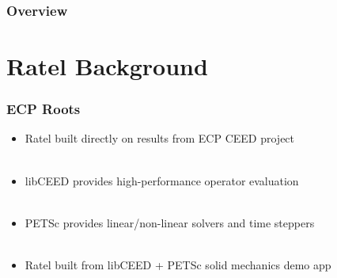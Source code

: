 \documentclass{beamer}
\begin{document}

\begin{frame}
\frametitle{Overview} %
\tableofcontents %
\end{frame}

\section{Ratel Background}

\begin{frame}
\begin{center}
\frametitle{ECP Roots}

\begin{itemize}

\item Ratel built directly on results from ECP CEED project\\

~\\

\item libCEED provides high-performance operator evaluation\\

~\\

\item PETSc provides linear/non-linear solvers and time steppers\\

~\\

\item Ratel built from libCEED + PETSc solid mechanics demo app\\

\end{itemize}

\end{center}
\end{frame}
\end{document}
